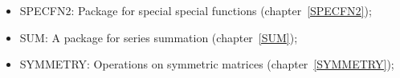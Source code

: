 \begin{itemize}
\item
{SPECFN2: Package for special special functions}
(chapter~\ref{SPECFN2}); 

\item
{SUM: A package for series summation} (chapter~\ref{SUM});

\item
{SYMMETRY: Operations on symmetric matrices} (chapter~\ref{SYMMETRY});


\end{itemize}
